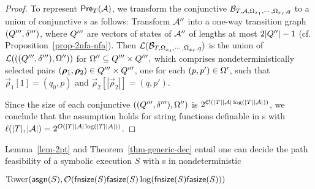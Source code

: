 \begin{proof}
To represent $\textsf{Pre}_{T}(\mathcal{A})$, we transform the conjunctive \FFA{} $\mathcal{B}_{T, \mathcal{A}, \Omega_{x_1}, \cdots, \Omega_{x_r},q}$ to a union of conjunctive \FA{}s as follows: Transform $\mathcal{A}''$ into a one-way transition graph $(Q''',\delta''')$, where $Q'''$ are vectors of states of $\mathcal{A}''$ of lengths at most $2|Q''|-1$ (cf. Proposition~\ref{prop-2nfa-nfa}). Then $\mathcal{L}(\mathcal{B}_{T, \Omega_{x_1}, \cdots, \Omega_{x_r},q})$ is the union of $\mathcal{L}(((Q''',\delta'''), \Omega''))$ for $\Omega'' \subseteq Q''' \times Q''',$ which comprises nondeterministically selected pairs $(\vec{\rho}_1, \vec{\rho}_2) \in \controls''' \times \controls'''$, one for each $(p, p') \in \Omega'$, such that $\vec{\rho}_1[1] =(q_0, p)$ and  $\vec{\rho}_2[|\vec{\rho}_2|] = (q, p')$.

Since the size of each conjunctive \FA{} $((Q''',\delta'''), \Omega'')$ is $ 2^{\mathcal{O}(|T||\mathcal{A}|\log (|T||\mathcal{A}|))}$, we conclude that 
the \prerec{} assumption holds for string functions definable in \PPT{}s with $\ell(|T|, |\mathcal{A}|) = 2^{O(|T||\mathcal{A}|\log (|T||\mathcal{A}|))}$.
\end{proof}

Lemma~\ref{lem-2pt} and Theorem~\ref{thm-generic-dec} entail %
one can decide the path feasibility of a symbolic execution $S$ with \PPT{}s in 
nondeterministic 

\smallskip
\hspace{1cm} $\mathrm{Tower}(\mathsf{asgn}(S), \mathcal{O}(\mathsf{fnsize}(S) \mathsf{fasize}(S)  \log(\mathsf{fnsize}(S) \mathsf{fasize}(S)))$ 
\smallskip

